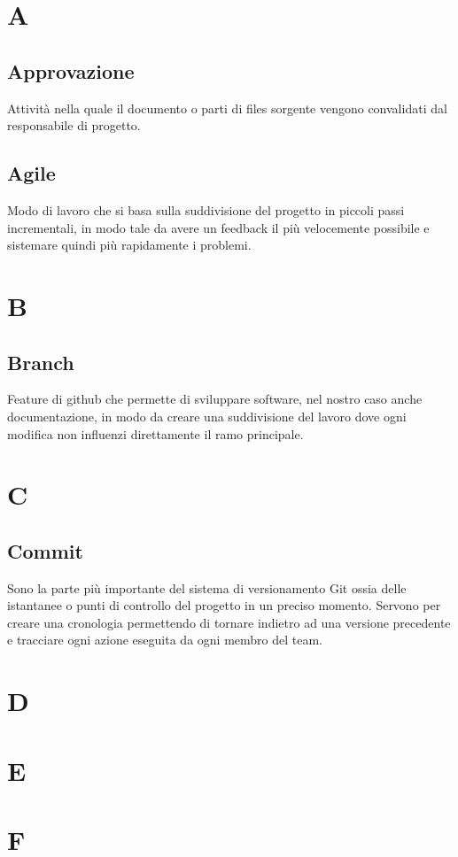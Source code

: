 \section{A}
    \subsection{Approvazione}
    Attività nella quale il documento o parti di files sorgente vengono convalidati dal responsabile di progetto.
    \subsection{Agile}
    Modo di lavoro che si basa sulla suddivisione del progetto in piccoli passi incrementali, in modo 
    tale da avere un feedback il più velocemente possibile e sistemare quindi più rapidamente i problemi.

\section{B}
    \subsection{Branch}
    Feature di github che permette di sviluppare software, nel nostro caso anche documentazione, in modo da creare una suddivisione del lavoro dove ogni modifica non 
    influenzi direttamente il ramo principale.

\section{C}
    \subsection{Commit}
    Sono la parte più importante del sistema di versionamento Git ossia delle istantanee o punti di controllo del progetto in un preciso momento.
    Servono per creare una cronologia permettendo di tornare indietro ad una versione precedente e tracciare ogni azione eseguita da ogni membro del team.

\section{D}
\section{E}
\section{F}
